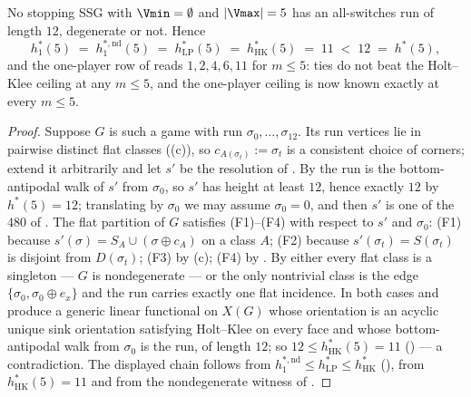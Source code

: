 \begin{theorem}\label{mw:no-twelve}
No stopping SSG with $\Vmin=\emptyset$ and $|\Vmax|=5$ has an all-switches
run of length $12$, degenerate or not. Hence
\[
  h^{\ast}_{1}(5)\;=\;h^{\ast,\mathrm{nd}}_{1}(5)\;=\;h^{\ast}_{\mathrm{LP}}(5)
  \;=\;h^{\ast}_{\mathrm{HK}}(5)\;=\;11\;<\;12\;=\;h^{\ast}(5),
\]
and the one-player row of  reads $1,2,4,6,11$ for
$m\le5$: ties do not beat the Holt--Klee ceiling at any $m\le5$, and the
one-player ceiling is now known exactly at every $m\le5$.
\end{theorem}

\begin{proof}
Suppose $G$ is such a game with run $\sigma_0,\dots,\sigma_{12}$. Its run
vertices lie in pairwise distinct flat classes ((c)), so
$c_{A(\sigma_t)}:=\sigma_t$ is a consistent choice of corners; extend it
arbitrarily and let $s'$ be the resolution of . By
 the run is the bottom-antipodal walk of $s'$ from
$\sigma_0$, so $s'$ has height at least $12$, hence exactly $12$ by
$h^{\ast}(5)=12$; translating by $\sigma_0$ we may assume $\sigma_0=0$, and
then $s'$ is one of the $480$ of . The flat partition of
$G$ satisfies (F1)--(F4) with respect to $s'$ and $\sigma_0$: (F1) because
$s'(\sigma)=S_A\cup(\sigma\oplus c_A)$ on a class $A$; (F2) because
$s'(\sigma_t)=S(\sigma_t)$ is disjoint from $D(\sigma_t)$; (F3) by
(c); (F4) by . By
 either every flat class is a singleton --- $G$ is
nondegenerate --- or the only nontrivial class is the edge
$\{\sigma_0,\sigma_0\oplus e_x\}$ and the run carries exactly one flat
incidence. In both cases  and 
produce a generic linear functional on $X(G)$ whose orientation is an acyclic
unique sink orientation satisfying Holt--Klee on every face and whose
bottom-antipodal walk from $\sigma_0$ is the run, of length $12$; so
$12\le h^{\ast}_{\mathrm{HK}}(5)=11$ () --- a
contradiction. The displayed chain follows from
$h^{\ast,\mathrm{nd}}_{1}\le h^{\ast}_{\mathrm{LP}}\le h^{\ast}_{\mathrm{HK}}$
(), from $h^{\ast}_{\mathrm{HK}}(5)=11$ and from the
nondegenerate witness of .
\end{proof}

